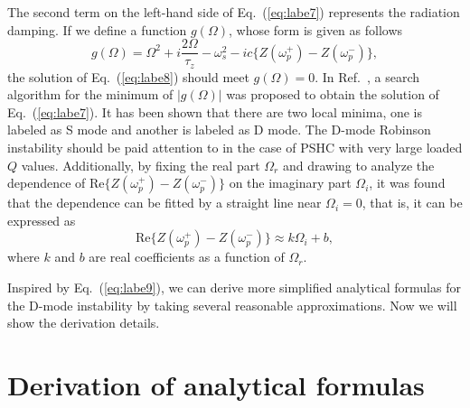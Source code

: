 \documentclass[%
 reprint,
 amsmath,amssymb,
 aps,
]{revtex4-1}
\begin{document}
The second term on the left-hand side of Eq.~(\ref{eq:labe7}) represents the radiation damping. If we define a function $g(\Omega)$, whose form is given as follows
\begin{equation}\label{eq:labe8}
   g(\Omega)=\Omega^2+i\frac{2\Omega}{\tau_z}-\omega^2_s-ic\{Z(\omega^{+}_p)-Z(\omega^{-}_p)\},
\end{equation}
the solution of Eq.~(\ref{eq:labe8}) should meet $g(\Omega)=0$. In Ref.~\cite{He06}, a search algorithm for the minimum of $|g(\Omega)|$ was proposed to obtain the solution of Eq.~(\ref{eq:labe7}). It has been shown that there are two local minima, one is labeled as S mode and another is labeled as D mode. The D-mode Robinson instability should be paid attention to in the case of PSHC with very large loaded $Q$ values. Additionally, by fixing the real part $\Omega_r$ and drawing to analyze the dependence of $\mathrm {Re}\{Z(\omega^{+}_p)-Z(\omega^{-}_p)\}$ on the imaginary part $\Omega_i$, it was found that the dependence can be fitted by a straight line near $\Omega_i=0$, that is, it can be expressed as 
\begin{equation}\label{eq:labe9}
   \mathrm {Re}\{Z(\omega^{+}_p)-Z(\omega^{-}_p)\} \approx k\Omega_i+b,
\end{equation}
where $k$ and $b$ are real coefficients as a function of $\Omega_r$.

Inspired by Eq.~(\ref{eq:labe9}), we can derive more simplified analytical formulas for the D-mode instability by taking several reasonable approximations. Now we will show the derivation details.

\section{\label{sec:level3} Derivation of analytical formulas}
\end{document}
